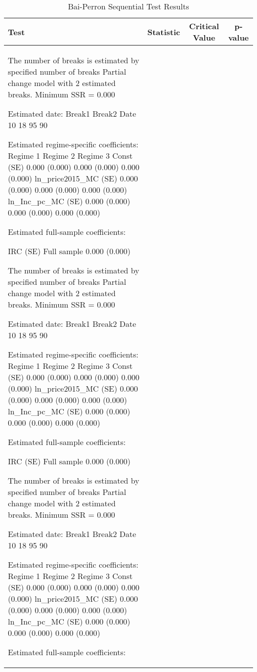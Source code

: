 \begin{table}[h]
\centering
\caption{Bai-Perron Sequential Test Results}
\begin{tabular}{lccc}
\hline
Test & Statistic & Critical Value & p-value \\
\hline
The number of breaks is estimated by specified number of breaks 
Partial change model with 2 estimated breaks.
Minimum SSR = 0.000 

Estimated date:
        Break1  Break2
Date        10      18
95%
90%

Estimated regime-specific coefficients:
                          Regime 1      Regime 2      Regime 3
Const (SE)           0.000 (0.000) 0.000 (0.000) 0.000 (0.000)
ln_price2015_MC (SE) 0.000 (0.000) 0.000 (0.000) 0.000 (0.000)
ln_Inc_pc_MC (SE)    0.000 (0.000) 0.000 (0.000) 0.000 (0.000)

Estimated full-sample coefficients:

                 IRC (SE)
Full sample 0.000 (0.000)

The number of breaks is estimated by specified number of breaks 
Partial change model with 2 estimated breaks.
Minimum SSR = 0.000 

Estimated date:
        Break1  Break2
Date        10      18
95%
90%

Estimated regime-specific coefficients:
                          Regime 1      Regime 2      Regime 3
Const (SE)           0.000 (0.000) 0.000 (0.000) 0.000 (0.000)
ln_price2015_MC (SE) 0.000 (0.000) 0.000 (0.000) 0.000 (0.000)
ln_Inc_pc_MC (SE)    0.000 (0.000) 0.000 (0.000) 0.000 (0.000)

Estimated full-sample coefficients:

                 IRC (SE)
Full sample 0.000 (0.000)

The number of breaks is estimated by specified number of breaks 
Partial change model with 2 estimated breaks.
Minimum SSR = 0.000 

Estimated date:
        Break1  Break2
Date        10      18
95%
90%

Estimated regime-specific coefficients:
                          Regime 1      Regime 2      Regime 3
Const (SE)           0.000 (0.000) 0.000 (0.000) 0.000 (0.000)
ln_price2015_MC (SE) 0.000 (0.000) 0.000 (0.000) 0.000 (0.000)
ln_Inc_pc_MC (SE)    0.000 (0.000) 0.000 (0.000) 0.000 (0.000)

Estimated full-sample coefficients:


\end{tabular}
\end{table}
